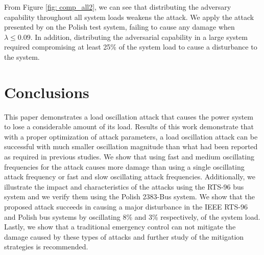 \documentclass[journal]{IEEEtran}
\begin{document}
From Figure \ref{fig: comp_all2}, we can see that distributing the adversary capability throughout all system loads weakens the attack. We apply the attack presented  by \cite{Anu} on the Polish test system, failing to cause any damage when $\lambda\leq 0.09$. In addition, distributing the adversarial capability in a large system required compromising at least 25\% of the system load to cause a disturbance to the system.     





\section{Conclusions} 
This paper demonstrates a load oscillation attack that causes the power system to lose a considerable amount of its load. %
Results of this work demonstrate that with a proper optimization of attack parameters, a load oscillation attack can be successful with much smaller oscillation magnitude than what had been reported as required in previous studies. We show that using fast and medium oscillating frequencies for the attack causes more damage than using a single oscillating attack frequency or fast and slow oscillating attack frequencies. Additionally, we illustrate the impact and characteristics of the attacks using the RTS-96 bus system and we verify them using the Polish 2383-Bus system. We show that the proposed attack succeeds in causing a major disturbance in the IEEE RTS-96 and Polish bus systems by oscillating 8\%  and 3\% respectively, of the system load. Lastly, we show that a traditional emergency control can not mitigate the damage caused by these types of attacks and further study of the mitigation strategies is recommended. 
\end{document}
